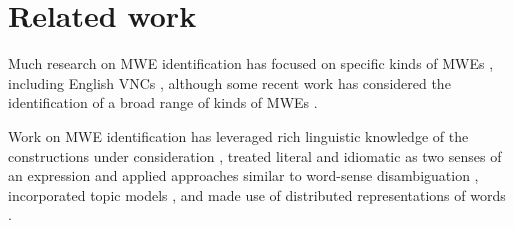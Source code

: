 \documentclass[11pt,a4paper]{article}
\begin{document}


\section{Related work} \label{related}



Much research on MWE identification has focused on specific kinds of
MWEs \citep[e.g.,][]{Patrick2005, Uchiyama2005}, including English
VNCs \citep[e.g.,][]{Fazly2009,salton-ross-kelleher}, although some
recent work has considered the identification of a broad range of
kinds of MWEs
\citep[e.g.,][]{Schneider+:2014,Brooke+:2014,savary-EtAl:2017:MWE2017}.

Work on MWE identification has leveraged rich linguistic knowledge of
the constructions under consideration
\citep[e.g.,][]{Fazly2009,Fothergill:Baldwin:2012}, treated literal
and idiomatic as two senses of an expression and applied approaches
similar to word-sense disambiguation
\citep[e.g.,][]{Birke2006,Hashimoto:Kawahara:2008}, incorporated topic
models \citep[e.g.,][]{Li+:2010}, and made use of distributed
representations of words \citep{gharbieh+:2016}.
\end{document}
